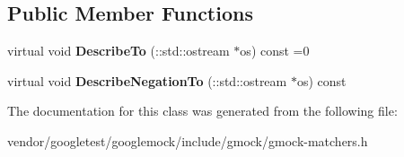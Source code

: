 \subsection*{Public Member Functions}
\begin{DoxyCompactItemize}
\item 
\mbox{\label{classtesting_1_1_matcher_describer_interface_ad9f861588bd969b6e3e717f13bb94e7b}} 
virtual void {\bfseries Describe\+To} (\+::std\+::ostream $\ast$os) const =0
\item 
\mbox{\label{classtesting_1_1_matcher_describer_interface_a2071afbc47097c4d1c0064275af34db0}} 
virtual void {\bfseries Describe\+Negation\+To} (\+::std\+::ostream $\ast$os) const
\end{DoxyCompactItemize}


The documentation for this class was generated from the following file\+:\begin{DoxyCompactItemize}
\item 
vendor/googletest/googlemock/include/gmock/gmock-\/matchers.\+h\end{DoxyCompactItemize}
